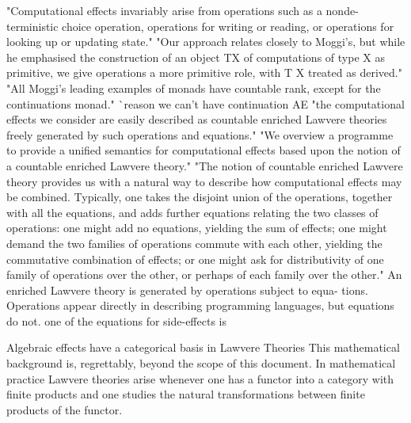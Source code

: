 \documentclass[a4paper,10pt]{article}
\theoremstyle{definition}
\begin{document}
"Computational effects invariably arise from operations such as a nonde- terministic choice operation, operations for writing or reading, or operations for looking up or updating state."
"Our approach relates closely to Moggi’s, but while he emphasised the construction of an object TX of computations of type X as primitive, we give operations a more primitive role, with T X treated as derived."
"All Moggi’s leading examples of monads have countable rank, except for the continuations monad."
^^ reason we can't have continuation AE
"the computational effects we consider are easily described as countable enriched Lawvere theories freely generated by such operations and equations."
"We overview a programme to provide a unified semantics for computational effects based upon the notion of a countable enriched Lawvere theory."\cite{plotkin2004computational}
"The notion of countable enriched Lawvere theory provides us with a natural way to describe how computational effects may be combined. Typically, one takes the disjoint union of the operations, together with all the equations, and adds further equations relating the two classes of operations: one might add no equations, yielding the sum of effects; one might demand the two families of operations commute with each other, yielding the commutative combination of effects; or one might ask for distributivity of one family of operations over the other, or perhaps of each family over the other."
An enriched Lawvere theory is generated by operations subject to equa- tions. Operations appear directly in describing programming languages, but equations do not.
one of the equations for side-effects is


\cite{plotkin2001adequacy}

Algebraic effects have a categorical basis in Lawvere Theories
This mathematical background is, regrettably, beyond the scope of this document.
In mathematical practice Lawvere theories arise whenever one has a functor into a category with finite products and one studies the natural transformations between finite products of the functor.
\cite{hyland2007category}
\end{document}
